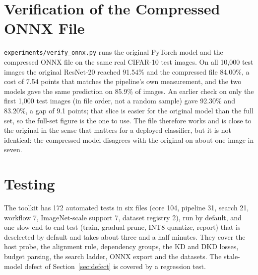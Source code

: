 \documentclass[oneside,a4paper,12pt]{report}
\newcommand{\code}[1]{\texttt{\small #1}}
\begin{document}
\section{Verification of the Compressed ONNX File}
\code{experiments/verify\_onnx.py} runs the original PyTorch model and the compressed ONNX file on the same real CIFAR-10 test images. On all 10,000 test images the original ResNet-20 reached 91.54\% and the compressed file 84.00\%, a cost of 7.54 points that matches the pipeline's own measurement, and the two models gave the same prediction on 85.9\% of images. An earlier check on only the first 1,000 test images (in file order, not a random sample) gave 92.30\% and 83.20\%, a gap of 9.1 points; that slice is easier for the original model than the full set, so the full-set figure is the one to use. The file therefore works and is close to the original in the sense that matters for a deployed classifier, but it is not identical: the compressed model disagrees with the original on about one image in seven.

\section{Testing}
The toolkit has 172 automated tests in six files (core 104, pipeline 31, search 21, workflow 7, ImageNet-scale support 7, dataset registry 2), run by default, and one slow end-to-end test (train, gradual prune, INT8 quantize, report) that is deselected by default and takes about three and a half minutes. They cover the host probe, the alignment rule, dependency groups, the KD and DKD losses, budget parsing, the search ladder, ONNX export and the datasets. The stale-model defect of Section~\ref{sec:defect} is covered by a regression test.
\end{document}

